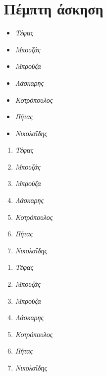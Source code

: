 \documentclass{article}
\begin{document}
\section{Πέμπτη άσκηση}
\begin{center} \bigskip
\begin{itemize}
\item \textit{Τέφας}
\item \textit{Μπουζάς}
\item \textit{Μπρούζα}
\item \textit{Λάσκαρης}
\item \textit{Κοτρόπουλος}
\item \textit{Πήτας}
\item \textit{Νικολαΐδης}
\end{itemize}
\begin{enumerate}
\item \textit{Τέφας}
\item \textit{Μπουζάς}
\item \textit{Μπρούζα}
\item \textit{Λάσκαρης}
\item \textit{Κοτρόπουλος}
\item \textit{Πήτας}
\item \textit{Νικολαΐδης}
\end{enumerate}
\begin{enumerate}[label=\textbf{(\greek*)}]
\item \textit{Τέφας}
\item \textit{Μπουζάς}
\item \textit{Μπρούζα}
\item \textit{Λάσκαρης}
\item \textit{Κοτρόπουλος}
\item \textit{Πήτας}
\item \textit{Νικολαΐδης}
\end{enumerate}
\end{center}
\end{document}
